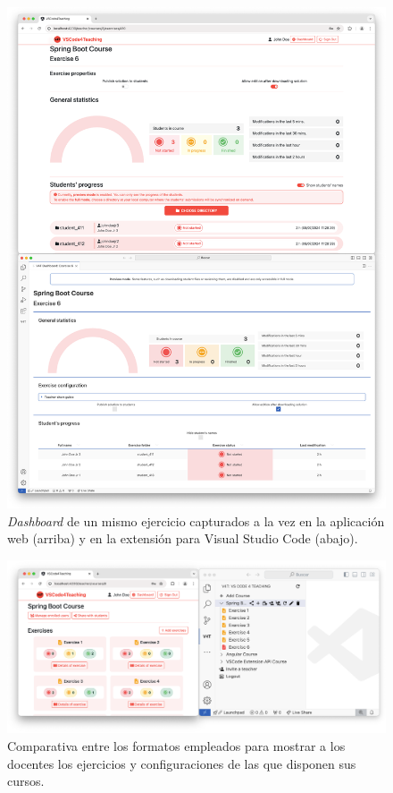 \begin{figure}[!p]
    \centering
    \includegraphics[width=\textwidth]{imagenes/utilizadas/4-3-implementacion/rn2-1.png}
    \caption{\textit{Dashboard} de un mismo ejercicio capturados a la vez en la aplicación web (arriba) y en la extensión para Visual Studio Code (abajo).}
    \label{fig:reqn2-1}
\end{figure}

\begin{figure}[ht!]
    \centering
    \includegraphics[width=\textwidth]{imagenes/utilizadas/4-3-implementacion/rn2-2.png}
    \caption{Comparativa entre los formatos empleados para mostrar a los docentes los ejercicios y configuraciones de las que disponen sus cursos.}
    \label{fig:reqn2-2}
\end{figure}
